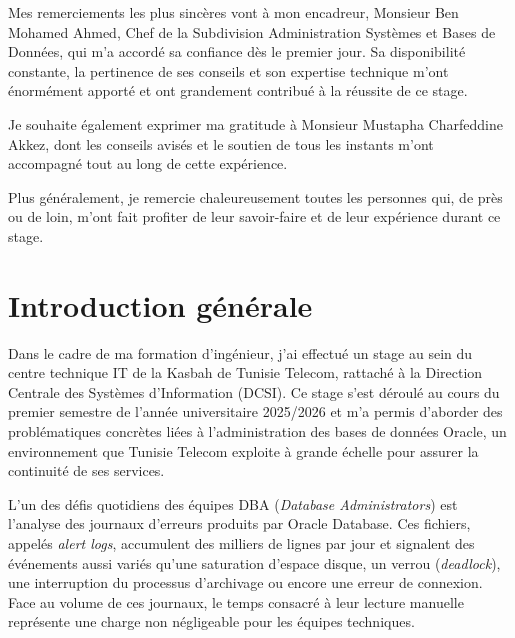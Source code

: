 \documentclass[12pt,a4paper]{report}
\begin{document}
Mes remerciements les plus sinc\`eres vont \`a mon encadreur, Monsieur Ben Mohamed
Ahmed, Chef de la Subdivision Administration Syst\`emes et Bases de Donn\'ees, qui
m'a accord\'e sa confiance d\`es le premier jour. Sa disponibilit\'e constante, la pertinence
de ses conseils et son expertise technique m'ont \'enorm\'ement apport\'e et ont grandement
contribu\'e \`a la r\'eussite de ce stage.

Je souhaite \'egalement exprimer ma gratitude \`a Monsieur Mustapha Charfeddine
Akkez, dont les conseils avis\'es et le soutien de tous les instants m'ont accompagn\'e tout
au long de cette exp\'erience.

Plus g\'en\'eralement, je remercie chaleureusement toutes les personnes qui, de pr\`es ou
de loin, m'ont fait profiter de leur savoir-faire et de leur exp\'erience durant ce stage.

\tableofcontents
\listoffigures
\listoftables

\chapter*{Introduction g\'en\'erale}

Dans le cadre de ma formation d'ing\'enieur, j'ai effectu\'e un stage au sein du centre
technique IT de la Kasbah de Tunisie Telecom, rattach\'e \`a la Direction Centrale des
Syst\`emes d'Information (DCSI). Ce stage s'est d\'eroul\'e au cours du premier semestre
de l'ann\'ee universitaire 2025/2026 et m'a permis d'aborder des probl\'ematiques
concr\`etes li\'ees \`a l'administration des bases de donn\'ees Oracle, un environnement
que Tunisie Telecom exploite \`a grande \'echelle pour assurer la continuit\'e de ses services.

L'un des d\'efis quotidiens des \'equipes DBA (\textit{Database Administrators}) est
l'analyse des journaux d'erreurs produits par Oracle Database. Ces fichiers,
appel\'es \emph{alert logs}, accumulent des milliers de lignes par jour et signalent des
\'ev\'enements aussi vari\'es qu'une saturation d'espace disque, un verrou
(\emph{deadlock}), une interruption du processus d'archivage ou encore une erreur de
connexion. Face au volume de ces journaux, le temps consacr\'e \`a leur lecture manuelle
repr\'esente une charge non n\'egligeable pour les \'equipes techniques.
\end{document}
